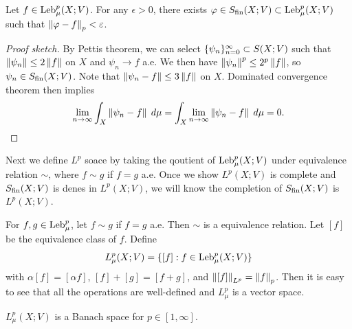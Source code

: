\documentclass[a4paper]{article}
\begin{document}
\begin{thm}
Let $f \in \operatorname{Leb}_\mu^p (X; V)$. For any $\epsilon > 0$, 
there exists $\varphi \in S_{\text{fin}}(X; V) \subset \operatorname{Leb}_\mu^p (X; V)$
such that $\left\lVert \varphi - f\right\rVert_p < \varepsilon$.
\end{thm}

\begin{proof}[Proof sketch]
By Pettis theorem, we can select $\{ \psi_n \}_{n=0}^\infty \subset 
S(X; V)$ such that $\left\lVert \psi_n\right\rVert \leq 2 \left\lVert f\right\rVert$ 
on $X$ and $\psi_n \to f$ a.e. We then have 
$\left\lVert \psi_n\right\rVert^p \leq 2^p \left\lVert f\right\rVert$, so $\psi_n 
\in S_{\text{fin}}(X ; V)$. Note that $\left\lVert \psi_n - f\right\rVert \leq 
3 \left\lVert f\right\rVert$ on $X$. Dominated convergence theorem then implies 
\[
\lim_{n \to \infty} \int_X \left\lVert \psi_n - f\right\rVert \; d \mu
= \int_X \lim_{n \to \infty} \left\lVert \psi_n - f\right\rVert \; d \mu
= 0.
\]
\end{proof}

Next we define $L^p$ soace by taking the qoutient of 
$\operatorname{Leb}_\mu^p (X; V)$ under equivalence relation $\sim$,
where $f \sim g$ if $f = g$ a.e. Once we show 
$L^p(X; V)$ is complete and $S_{\text{fin}}(X; V)$ is denes in 
$L^p(X; V)$, we will know the completion of 
$S_{\text{fin}}(X; V)$ is $L^p(X; V)$.

\begin{defi}[$L^p$ spaces]
For $f, g \in \operatorname{Leb}_\mu^p$, let $f \sim g$ if 
$f = g$ a.e. Then $\sim$ is a equivalence relation.
Let $[f]$ be the equivalence class of $f$. Define 
\[
L^p_\mu (X; V) = \{[f] : f \in \operatorname{Leb}_\mu^p (X; V)\}
\]
with $\alpha [f] = [\alpha f]$, $[f] + [g] = [f + g]$, 
and $\left\lVert [f]\right\rVert_{L^p} = \left\lVert f\right\rVert_p$. Then it is easy to see 
that all the operations are well-defined and $L^p_\mu$ is 
a vector space.
\end{defi}

\begin{thm}
$L^p_\mu(X; V)$ is a Banach space for $p \in [1, \infty]$.
\end{thm}
\end{document}

